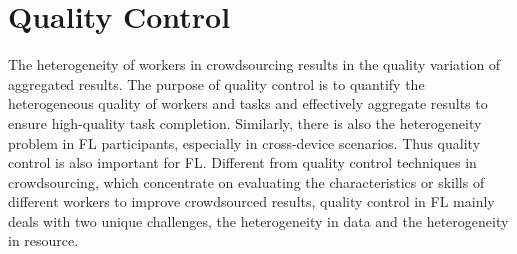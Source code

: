 \documentclass[11pt]{article}
\newcommand{\etc}{etc.\xspace}
\begin{document}
\section{Quality Control}
\label{sec:QualityControl}
The heterogeneity of workers in crowdsourcing results in the quality variation of aggregated results. %
The purpose of quality control is to quantify the heterogeneous quality of workers and tasks and effectively aggregate results to ensure high-quality task completion. 
Similarly, there is also the heterogeneity problem in FL participants, especially in cross-device scenarios. 
Thus quality control is also important for FL.
Different from quality control techniques in crowdsourcing, which concentrate on evaluating the characteristics or skills of different workers to improve crowdsourced results, quality control in FL mainly deals with two unique challenges, the heterogeneity in data and the heterogeneity in resource. 

\end{document}
